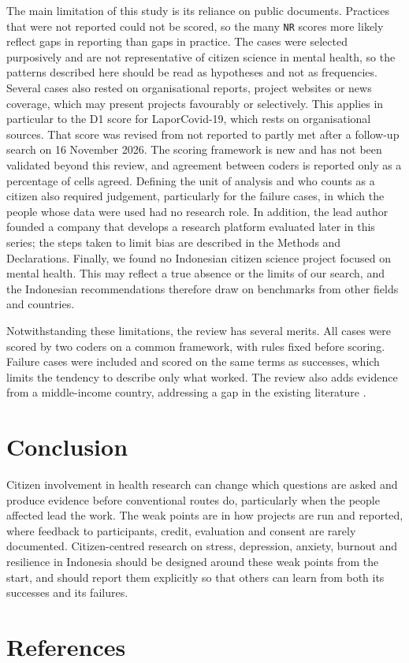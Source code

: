 \documentclass[
  number,
  preprint]{elsarticle}
\begin{document}
The main limitation of this study is its reliance on public documents.
Practices that were not reported could not be scored, so the many
\texttt{NR} scores more likely reflect gaps in reporting than gaps in
practice. The cases were selected purposively and are not representative
of citizen science in mental health, so the patterns described here
should be read as hypotheses and not as frequencies. Several cases also
rested on organisational reports, project websites or news coverage,
which may present projects favourably or selectively. This applies in
particular to the D1 score for LaporCovid-19, which rests on
organisational sources. That score was revised from not reported to
partly met after a follow-up search on 16 November 2026. The scoring
framework is new and has not been validated beyond this review, and
agreement between coders is reported only as a percentage of cells
agreed. Defining the unit of analysis and who counts as a citizen also
required judgement, particularly for the failure cases, in which the
people whose data were used had no research role. In addition, the lead
author founded a company that develops a research platform evaluated
later in this series; the steps taken to limit bias are described in the
Methods and Declarations. Finally, we found no Indonesian citizen
science project focused on mental health. This may reflect a true
absence or the limits of our search, and the Indonesian recommendations
therefore draw on benchmarks from other fields and countries.

Notwithstanding these limitations, the review has several merits. All
cases were scored by two coders on a common framework, with rules fixed
before scoring. Failure cases were included and scored on the same terms
as successes, which limits the tendency to describe only what worked.
The review also adds evidence from a middle-income country, addressing a
gap in the existing literature \citep{todowede2023}.

\section{Conclusion}\label{sec-conclusion}

Citizen involvement in health research can change which questions are
asked and produce evidence before conventional routes do, particularly
when the people affected lead the work. The weak points are in how
projects are run and reported, where feedback to participants, credit,
evaluation and consent are rarely documented. Citizen-centred research
on stress, depression, anxiety, burnout and resilience in Indonesia
should be designed around these weak points from the start, and should
report them explicitly so that others can learn from both its successes
and its failures.

\section*{References}\label{references}

\renewcommand{\bibsection}{}

\end{document}
